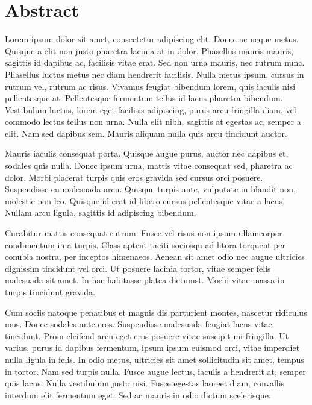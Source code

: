 \section*{Abstract}
Lorem ipsum dolor sit amet, consectetur adipiscing elit. Donec ac neque metus. Quisque a elit non justo pharetra lacinia at in dolor. Phasellus mauris mauris, sagittis id dapibus ac, facilisis vitae erat. Sed non urna mauris, nec rutrum nunc. Phasellus luctus metus nec diam hendrerit facilisis. Nulla metus ipsum, cursus in rutrum vel, rutrum ac risus. Vivamus feugiat bibendum lorem, quis iaculis nisi pellentesque at. Pellentesque fermentum tellus id lacus pharetra bibendum. Vestibulum luctus, lorem eget facilisis adipiscing, purus arcu fringilla diam, vel commodo lectus tellus non urna. Nulla elit nibh, sagittis at egestas ac, semper a elit. Nam sed dapibus sem. Mauris aliquam nulla quis arcu tincidunt auctor.

Mauris iaculis consequat porta. Quisque augue purus, auctor nec dapibus et, sodales quis nulla. Donec ipsum urna, mattis vitae consequat sed, pharetra ac dolor. Morbi placerat turpis quis eros gravida sed cursus orci posuere. Suspendisse eu malesuada arcu. Quisque turpis ante, vulputate in blandit non, molestie non leo. Quisque id erat id libero cursus pellentesque vitae a lacus. Nullam arcu ligula, sagittis id adipiscing bibendum.

Curabitur mattis consequat rutrum. Fusce vel risus non ipsum ullamcorper condimentum in a turpis. Class aptent taciti sociosqu ad litora torquent per conubia nostra, per inceptos himenaeos. Aenean sit amet odio nec augue ultricies dignissim tincidunt vel orci. Ut posuere lacinia tortor, vitae semper felis malesuada sit amet. In hac habitasse platea dictumst. Morbi vitae massa in turpis tincidunt gravida.

Cum sociis natoque penatibus et magnis dis parturient montes, nascetur ridiculus mus. Donec sodales ante eros. Suspendisse malesuada feugiat lacus vitae tincidunt. Proin eleifend arcu eget eros posuere vitae suscipit mi fringilla. Ut varius, purus id dapibus fermentum, ipsum ipsum euismod orci, vitae imperdiet nulla ligula in felis. In odio metus, ultricies sit amet sollicitudin sit amet, tempus in tortor. Nam sed turpis nulla. Fusce augue lectus, iaculis a hendrerit at, semper quis lacus. Nulla vestibulum justo nisi. Fusce egestas laoreet diam, convallis interdum elit fermentum eget. Sed ac mauris in odio dictum scelerisque.

